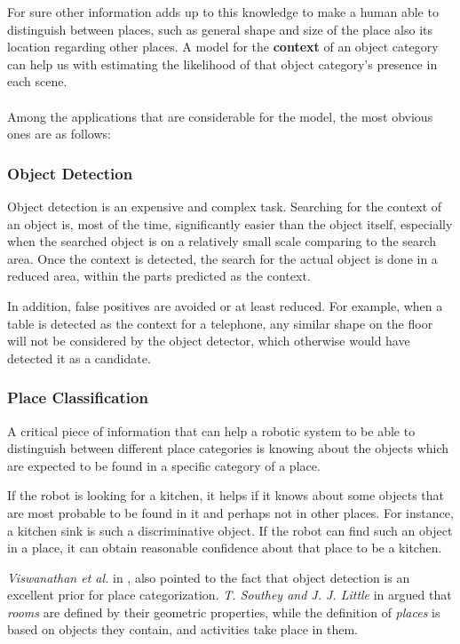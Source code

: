 For sure other information adds up to this knowledge to make a human able to distinguish between places, such as general 
shape and size of the place also its location regarding other places. A model for the {\bf context} of an object category can help us with estimating the likelihood of that object category's presence in each scene.
\\
\\
Among the applications that are considerable for the model, the most obvious ones are as follows:


\subsubsection*{Object Detection}

Object detection is an expensive and complex task. Searching for the context of 
an object is, most of the time, significantly easier than the object itself, especially when the searched object is on a relatively small scale comparing to the search area. Once the context is detected, the search for the actual object is done in a reduced area, within the parts predicted as the context.  

In addition, false positives are avoided or at least reduced. For example, when a table is detected as the context for a telephone, any similar shape  on the floor will not be considered by the object detector, which otherwise would have detected it as a candidate. 

\subsubsection*{Place Classification}
 
A critical piece of information that can help a robotic system to be able to distinguish between different place categories 
is knowing about the objects which are expected to be found in a specific category of a place. 

If the robot is looking for a kitchen, it helps if it knows about some objects that are most probable to be found in it and 
perhaps not in other places. 
For instance, a kitchen sink is such a discriminative object. 
If the robot can find such an object in a place, it can obtain reasonable confidence about that place to be a kitchen. 

{\it Viswanathan et al.} in \cite{P.Viswanathan}, also pointed to the fact that object detection is an excellent prior for place 
categorization. {\it T. Southey and J. J. Little} in \cite{southey2006object} argued that {\it rooms} are defined by their geometric 
properties, while the definition of {\it places} is based on objects they contain, and activities take place in them.  

